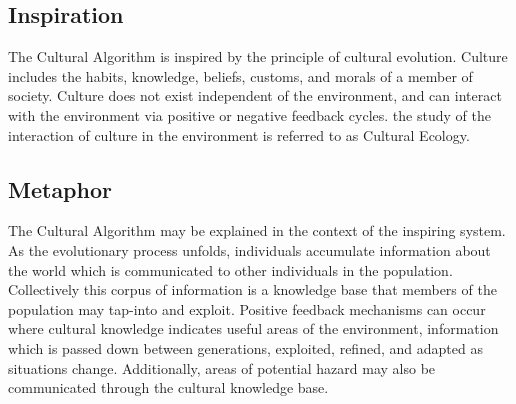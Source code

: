 \subsection{Inspiration}
The Cultural Algorithm is inspired by the principle of cultural evolution.
Culture includes the habits, knowledge, beliefs, customs, and morals of a member of society. Culture does not exist independent of the environment, and can interact with the environment via positive or negative feedback cycles. the study of the interaction of culture in the environment is referred to as Cultural Ecology.

\subsection{Metaphor}
The Cultural Algorithm may be explained in the context of the inspiring system. As the evolutionary process unfolds, individuals accumulate information about the world which is communicated to other individuals in the population. Collectively this corpus of information is a knowledge base that members of the population may tap-into and exploit. Positive feedback mechanisms can occur where cultural knowledge indicates useful areas of the environment, information which is passed down between generations, exploited, refined, and adapted as situations change. Additionally, areas of potential hazard may also be communicated through the cultural knowledge base.

